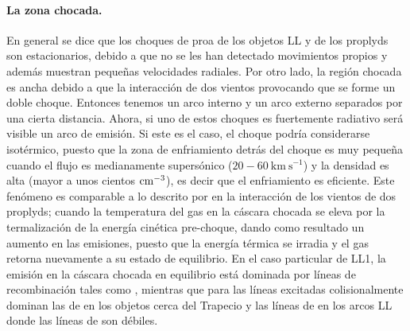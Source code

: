\paragraph{La zona chocada.} En general se dice que los choques de proa de los objetos LL y de los proplyds son estacionarios, debido a que no se les han detectado movimientos propios y además muestran pequeñas velocidades radiales. Por otro lado, la región chocada es ancha debido a que la interacción de dos vientos provocando que se forme un doble choque. Entonces tenemos un arco interno y un arco externo separados por una cierta distancia. Ahora, si uno de estos choques es fuertemente radiativo será visible un arco de emisión. Si este es el caso, el choque podría considerarse isotérmico, puesto que la zona de enfriamiento detrás del choque es muy pequeña cuando el flujo es medianamente supersónico (\(20-60~\text{km}~\text{s}^{-1}\)) y la densidad es alta (mayor a unos cientos \(\mathrm{cm}^{-3}\)), es decir que el enfriamiento es eficiente. Este fenómeno es comparable a lo descrito por \citet{Henney:2002} en la interacción de los vientos de dos proplyds; cuando la temperatura del gas en la cáscara chocada se eleva por la termalización de la energía cinética pre-choque, dando como resultado un aumento en las emisiones, puesto que la energía térmica se irradia y el gas retorna nuevamente a su estado de equilibrio. En el caso particular de LL1, la emisión en la cáscara chocada en equilibrio está dominada por líneas de recombinación tales como \ha{}, mientras que para las líneas excitadas colisionalmente dominan las de \oiii{} en los objetos cerca del Trapecio y las líneas de \nii{} en los arcos LL donde las líneas de \oiii{} son débiles.\\ 

